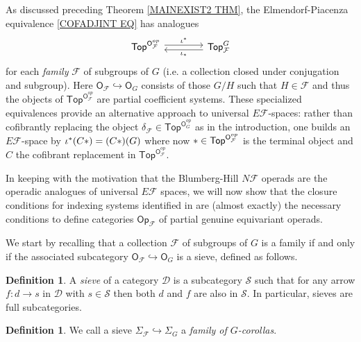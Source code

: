 \documentclass[a4paper,10pt
,draft
]{article}%
\numberwithin{equation}{section}
\numberwithin{figure}{section}
\theoremstyle{definition} %
\newtheorem{definition}[equation]{Definition}%
\newcommand{\1}{\ensuremath{\mathbbm 1}}%
\begin{document}
As discussed preceding Theorem \ref{MAINEXIST2 THM},
the Elmendorf-Piacenza equivalence
\eqref{COFADJINT EQ} has analogues
\[
\begin{tikzcd}[column sep =4em,row sep=0.3em]
	\mathsf{Top}^{\mathsf{O}_{\mathcal{F}}^{op}}
	\ar[shift left=1]{r}{\iota^{\**}} 
&
	\mathsf{Top}_{\mathcal{F}}^G
	\ar[shift left=1]{l}{\iota_{\**}}
\end{tikzcd}
\]
for each \textit{family} $\mathcal{F}$ of subgroups of $G$
(i.e. a collection closed under conjugation and subgroup).
Here $\mathsf{O}_\mathcal{F} \hookrightarrow \mathsf{O}_G$ consists of those $G/H$ such that $H \in \mathcal{F}$ 
and thus the objects of
$\mathsf{Top}^{\mathsf{O}_{\mathcal{F}}^{op}}$
are partial coefficient systems.
These specialized equivalences provide an alternative approach to universal 
$E \mathcal{F}$-spaces: rather than cofibrantly replacing the object
$\delta_{\mathcal{F}} \in \mathsf{Top}^{\mathsf{O}_G^{op}}$
as in the introduction,
one builds an $E \mathcal{F}$-space by
$\iota^{\**}(C \**) = (C *) (G)$
where now $\** \in \mathsf{Top}^{\mathsf{O}_{\mathcal{F}}^{op}}$
is the terminal object and $C$ the cofibrant replacement in $\mathsf{Top}^{\mathsf{O}_{\mathcal{F}}^{op}}$.

In keeping with the motivation that the Blumberg-Hill $N \mathcal{F}$ operads are the operadic analogues of universal $E \mathcal{F}$ spaces,
we will now show that the closure conditions for 
indexing systems
identified in \cite[Def. 3.22]{BH15}
are (almost exactly) the necessary conditions to define categories 
$\mathsf{Op}_{\mathcal{F}}$
of partial genuine equivariant operads.

We start by recalling that 
a collection $\mathcal F$ of subgroups of $G$
is a family %
if and only if the associated subcategory 
$\mathsf{O}_{\mathcal{F}} \hookrightarrow
\mathsf{O}_G$ is a sieve, defined as follows.


\begin{definition}
	A \textit{sieve} of a category $\mathcal{D}$
	is a subcategory $\mathcal{S}$ such that
	for any arrow $f \colon d \to s$ in $\mathcal{D}$ with 
	$s \in \mathcal{S}$ then both $d$ and $f$ are also in $\mathcal{S}$. 
	In particular, sieves are full subcategories.
\end{definition}

\begin{definition}\label{FAMILY_COROLLAS_DEF}
      We call a sieve
      $\Sigma_{\mathcal{F}} \hookrightarrow \Sigma_G$
      a \textit{family of $G$-corollas}.
\end{definition}
\end{document}

